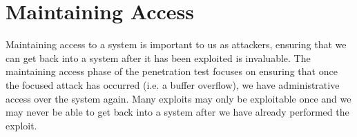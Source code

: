 
\section{\label{sec:maintaining_access}Maintaining Access}
Maintaining access to a system is important to us as attackers, ensuring that
we can get back into a system after it has been exploited is invaluable. The
maintaining access phase of the penetration test focuses on ensuring that once
the focused attack has occurred (i.e. a buffer overflow), we have
administrative access over the system again. Many exploits may only be
exploitable once and we may never be able to get back into a system after we
have already performed the exploit.
